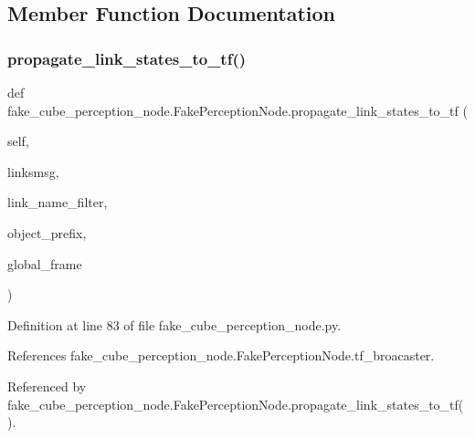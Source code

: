\subsection{Member Function Documentation}
\mbox{\label{classfake__cube__perception__node_1_1FakePerceptionNode_aeac788f768e625ecbe445c6af105d3f8}} 
\subsubsection{\texorpdfstring{propagate\+\_\+link\+\_\+states\+\_\+to\+\_\+tf()}{propagate\_link\_states\_to\_tf()}\hspace{0.1cm}{\footnotesize\ttfamily [1/2]}}
{\footnotesize\ttfamily def fake\+\_\+cube\+\_\+perception\+\_\+node.\+Fake\+Perception\+Node.\+propagate\+\_\+link\+\_\+states\+\_\+to\+\_\+tf (\begin{DoxyParamCaption}\item[{}]{self,  }\item[{}]{linksmsg,  }\item[{}]{link\+\_\+name\+\_\+filter,  }\item[{}]{object\+\_\+prefix,  }\item[{}]{global\+\_\+frame }\end{DoxyParamCaption})}



Definition at line 83 of file fake\+\_\+cube\+\_\+perception\+\_\+node.\+py.



References fake\+\_\+cube\+\_\+perception\+\_\+node.\+Fake\+Perception\+Node.\+tf\+\_\+broacaster.



Referenced by fake\+\_\+cube\+\_\+perception\+\_\+node.\+Fake\+Perception\+Node.\+propagate\+\_\+link\+\_\+states\+\_\+to\+\_\+tf().


